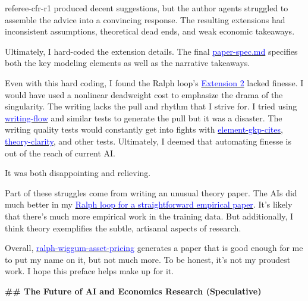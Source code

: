 \documentclass[12pt]{article}
\begin{document}
\begin{mdframed}[
linewidth=1pt,
linecolor=black,
innerleftmargin=0.25em,
innerrightmargin=0.25em,
innertopmargin=0.2\baselineskip,
innerbottommargin=0.8\baselineskip
]
\colorbox{gray!10}{\textcolor{red!70!black}{referee-cfr-r1}} produced decent suggestions, but the author agents struggled to assemble the advice into a convincing response. The resulting extensions had inconsistent assumptions, theoretical dead ends, and weak economic takeaways.

Ultimately, I hard-coded the extension details. The final \href{https://github.com/chenandrewy/ralph-wiggum-asset-pricing/blob/main/spec/paper-spec.md}{\textcolor{blue}{paper-spec.md}} specifies both the key modeling elements as well as the narrative takeaways.

Even with this hard coding, I found the Ralph loop's \hyperref[sec:ext2]{\textcolor{blue}{Extension 2}} lacked finesse. I would have used a nonlinear deadweight cost to emphasize the drama of the singularity. The writing lacks the pull and rhythm that I strive for. I tried using \href{https://github.com/chenandrewy/ralph-wiggum-asset-pricing/blob/0858ce2834650706baf808ec0452564005803a51/tests/writing-flow.py}{\textcolor{blue}{writing-flow}} and similar tests to generate the pull but it was a disaster. The writing quality tests would constantly get into fights with \href{https://github.com/chenandrewy/ralph-wiggum-asset-pricing/blob/main/tests/element-gkp-cites.py}{\textcolor{blue}{element-gkp-cites}}, \href{https://github.com/chenandrewy/ralph-wiggum-asset-pricing/blob/main/tests/theory-clarity.py}{\textcolor{blue}{theory-clarity}}, and other tests. Ultimately, I deemed that automating finesse is out of the reach of current AI.

It was both disappointing and relieving.

Part of these struggles come from writing an unusual theory paper. The AIs did much better in my \href{https://github.com/chenandrewy/HumanxAI-ChenAY}{\textcolor{blue}{Ralph loop for a straightforward empirical paper}}. It's likely that there's much more empirical work in the training data. But additionally, I think theory exemplifies the subtle, artisanal aspects of research.

Overall, \href{https://github.com/chenandrewy/ralph-wiggum-asset-pricing/tree/main}{\textcolor{blue}{ralph-wiggum-asset-pricing}} generates a paper that is good enough for me to put my name on it, but not much more. To be honest, it's not my proudest work. I hope this preface helps make up for it.

\par
{\large\bfseries \textcolor{red!70!black}{\#\# The Future of AI and Economics Research (Speculative)}}
\par


\end{mdframed}
\end{document}
